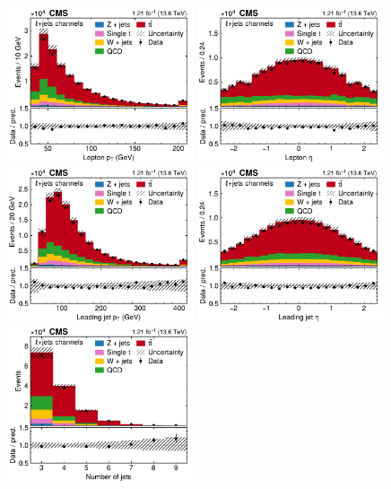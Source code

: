 \begin{figure}[!hp]
\centering
\includegraphics[width=0.49\textwidth]{figures/ttxs/lep_pt_lj.pdf}
\hfill
\includegraphics[width=0.49\textwidth]{figures/ttxs/lep_eta_lj.pdf}
\includegraphics[width=0.49\textwidth]{figures/ttxs/1st_jet_pt_lj.pdf}
\hfill
\includegraphics[width=0.49\textwidth]{figures/ttxs/1st_jet_eta_lj.pdf}
\includegraphics[width=0.49\textwidth]{figures/ttxs/njet_lj.pdf}

\end{figure}
